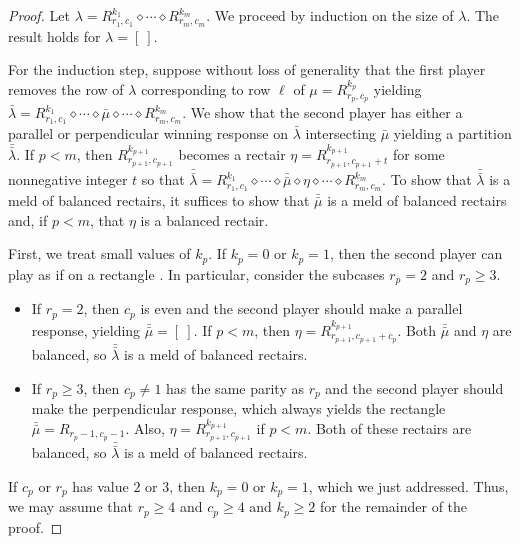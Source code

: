 \documentclass[pdflatex,sn-mathphys-num]{sn-jnl}%
\theoremstyle{thmstyleone}%
\theoremstyle{thmstyletwo}%
\theoremstyle{thmstylethree}%
\begin{document}
\thmrectairs*
\begin{proof}
    Let $\lambda = R^{k_1}_{r_1, c_1} \diamond \cdots \diamond R^{k_m}_{r_m, c_m}$. We proceed by induction on the size of $\lambda$. The result holds for $\lambda = [ \ ]$. 
    
    For the induction step, suppose without loss of generality that the first player removes the row of $\lambda$ corresponding to row $\ell$ of $\mu = R^{k_p}_{r_p, c_p}$ yielding $\bar \lambda = R^{k_1}_{r_1, c_1} \diamond \cdots \diamond \bar \mu \diamond \cdots \diamond R^{k_m}_{r_m, c_m}.$ 
    We show that the second player has either a parallel or perpendicular winning response on $\bar \lambda$ intersecting $\bar \mu$ yielding a partition $\bar{\bar \lambda}$. If $p < m$, then $R^{k_{p+1}}_{r_{p+1}, c_{p+1}}$ becomes a rectair $\eta = R^{k_{p+1}}_{r_{p+1}, c_{p+1}+t}$ for some nonnegative integer $t$ so that $\bar{\bar \lambda} = R^{k_1}_{r_1, c_1} \diamond \cdots \diamond \bar{\bar \mu} \diamond \eta \diamond \cdots \diamond R^{k_m}_{r_m, c_m}$. 
    To show that $\bar{\bar \lambda}$ is a meld of balanced rectairs, it suffices to show that $\bar{\bar \mu}$ is a meld of balanced rectairs and, if $p < m$, that $\eta$ is a balanced rectair.    
    
First, we treat small values of $k_p$. If $k_p = 0$ or $k_p = 1$, then the second player can play as if on a rectangle \cite{GKM22LCTR}. In particular, consider the subcases $r_p = 2$ and $r_p \geq 3$. 
\begin{itemize}
    \item If $r_p = 2$, then $c_p$ is even and the second player should make a parallel response, yielding $\bar{\bar \mu} = [ \ ]$. If $p < m$, then $\eta = R^{k_{p+1}}_{r_{p+1}, c_{p+1} + c_p}$. Both $\bar{\bar \mu}$ and $\eta$ are balanced, so $\bar{\bar \lambda}$ is a meld of balanced rectairs. 
    \item 
    If $r_p \geq 3$, then $c_p \neq 1$ has the same parity as $r_p$ and the second player should make the perpendicular response, which always yields the rectangle $\bar{\bar \mu} = R_{r_p-1, c_p - 1}$. Also, $\eta = R^{k_{p+1}}_{r_{p+1}, c_{p+1}}$ if $p < m$. 
    Both of these rectairs are balanced, so $\bar{\bar \lambda}$ is a meld of balanced rectairs. 
\end{itemize}
If $c_p$ or $r_p$ has value $2$ or $3$, then $k_p = 0$ or $k_p = 1$, which we just addressed. Thus, we may assume that $r_p \geq 4$ and $c_p \geq 4$ and $k_p \geq 2$ for the remainder of the proof. 


\end{proof}
\end{document}
